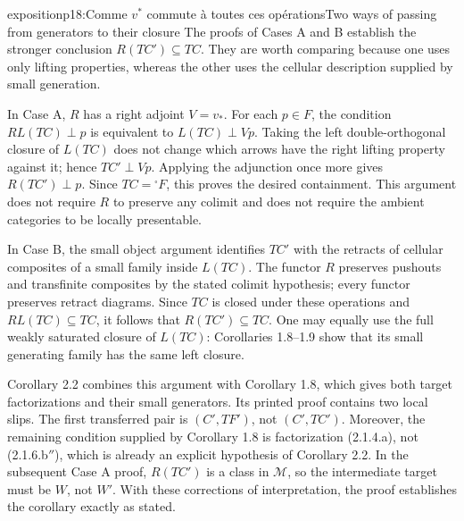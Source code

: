 \begin{dcomment}{exposition}{p18:Comme $v^*$ commute à toutes ces opérations}{Two ways of passing from generators to their closure}
The proofs of Cases A and B establish the stronger conclusion $R(TC')\subseteq TC$. They are worth comparing because one uses only lifting properties, whereas the other uses the cellular description supplied by small generation.

In Case A, $R$ has a right adjoint $V=v_*$. For each $p\in F$, the condition $RL(TC)\perp p$ is equivalent to $L(TC)\perp Vp$. Taking the left double-orthogonal closure of $L(TC)$ does not change which arrows have the right lifting property against it; hence $TC'\perp Vp$. Applying the adjunction once more gives $R(TC')\perp p$. Since $TC={}^{\square}F$, this proves the desired containment. This argument does not require $R$ to preserve any colimit and does not require the ambient categories to be locally presentable.

In Case B, the small object argument identifies $TC'$ with the retracts of cellular composites of a small family inside $L(TC)$. The functor $R$ preserves pushouts and transfinite composites by the stated colimit hypothesis; every functor preserves retract diagrams. Since $TC$ is closed under these operations and $RL(TC)\subseteq TC$, it follows that $R(TC')\subseteq TC$. One may equally use the full weakly saturated closure of $L(TC)$: Corollaries 1.8--1.9 show that its small generating family has the same left closure.

Corollary 2.2 combines this argument with Corollary 1.8, which gives both target factorizations and their small generators. Its printed proof contains two local slips. The first transferred pair is $(C',TF')$, not $(C',TC')$. Moreover, the remaining condition supplied by Corollary 1.8 is factorization (2.1.4.a), not (2.1.6.b$''$), which is already an explicit hypothesis of Corollary 2.2. In the subsequent Case A proof, $R(TC')$ is a class in $\mathcal M$, so the intermediate target must be $W$, not $W'$. With these corrections of interpretation, the proof establishes the corollary exactly as stated.
\end{dcomment}


